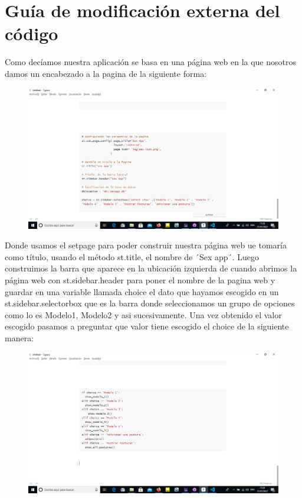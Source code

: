 \documentclass{llncs}
\begin{document}
\section{Guía de modificación externa del código}
Como decíamos nuestra aplicación se basa en una página web en la que nosotros damos un encabezado a la pagina de la siguiente forma:
\begin{figure}
	\centering
	\includegraphics[width=0.7\linewidth]{Imagenes/Codigo-Aplicacion/1}
	\label{fig:1}
\end{figure}
Donde usamos el setpage para poder construir nuestra página web ue tomaría como título, usando el método st.title, el nombre de ´Sex app´.
\newline
\newline
Luego construimos la barra que aparece en la ubicación izquierda de cuando abrimos la página web con st.sidebar.header para poner el nombre de la pagina web y guardar en una variable llamada choice el dato que hayamos escogido en un st.sidebar.selectorbox que es la barra donde seleccionamos un grupo de opciones como lo es Modelo1, Modelo2 y asi sucesivamente.
\newline
\newline
Una vez obtenido el valor escogido pasamos a preguntar que valor tiene escogido el choice de la siguiente manera:

\begin{figure}
	\centering
	\includegraphics[width=0.7\linewidth]{Imagenes/Codigo-Aplicacion/2}
	\label{fig:2}
\end{figure}
\end{document}
